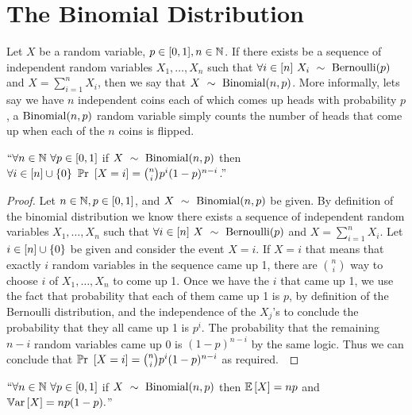     \section{The Binomial Distribution}
        \begin{definition}
            Let $X$ be a random variable, $p \in [0, 1], n \in \mathbb{N}$. If there exists 
            be a sequence of independent random variables $X_1, \dots, X_n$ such that $\forall i \in [n] \ \dist{X_i}{\bern{p}}$
            and $X = \sum_{i = 1}^{n} X_i$, then we say that $X~\sim~\mathrm{Binomial}(n, p)$. More informally,
            lets say we have $n$ independent coins each of which comes up heads with probability $p$,
            a $\mathrm{Binomial}(n, p)$ random variable simply counts the number of heads that come up when each 
            of the $n$ coins is flipped.
        \end{definition}
        \begin{theorem}
            $``\forall n \in \mathbb{N} \ \forall p \in [0, 1]$ if $X~\sim~\mathrm{Binomial}(n, p)$ then \\
            $\forall i \in [n] \cup \left\{0\right\} \ \mathbb{P}\mathrm{r}~\left[X = i\right] = \binom{n}{i}p^i(1 - p)^{n - i}$.''
        \end{theorem}
        \begin{proof}
            Let $n \in \mathbb{N}, p \in [0, 1]$, and $X~\sim~\mathrm{Binomial}(n, p)$ be given. By definition
            of the binomial distribution we know there exists a sequence of independent random variables
            $X_1, \dots, X_n$ such that $\forall i \in [n] \ \dist{X}{\bern{p}}$ and
            $X = \sum_{i = 1}^{n} X_i$. Let $i \in [n] \cup \left\{0\right\}$ be given and consider
            the event $X = i$. If $X = i$ that means that exactly $i$ random variables in the
            sequence came up 1, there are $\binom{n}{i}$ way to choose $i$ of $X_1, \dots, X_n$
            to come up 1. Once we have the $i$ that came up 1, we use the fact that probability that
            each of them came up 1 is $p$, by definition of the Bernoulli distribution, and the 
            independence of the $X_j$'s to conclude 
            the probability that they all came up 1 is $p^{i}$.
            The probability that the remaining $n - i$ random variables came up 0 is $(1 - p)^{n - i}$
            by the same logic. Thus we can conclude that $\mathbb{P}\mathrm{r}~\left[X = i\right] = \binom{n}{i}p^i(1 - p)^{n - i}$
            as required.~\QED
        \end{proof}
        \begin{theorem}
            $``\forall n \in \mathbb{N} \ \forall p \in [0, 1]$ if $X~\sim~\mathrm{Binomial}(n, p)$ then
            $\mathbb{E}\left[X\right] = np$ and $\mathbb{V}\mathrm{ar}\left[X\right] = np(1 - p).$''
            \label{bin}
        \end{theorem}
